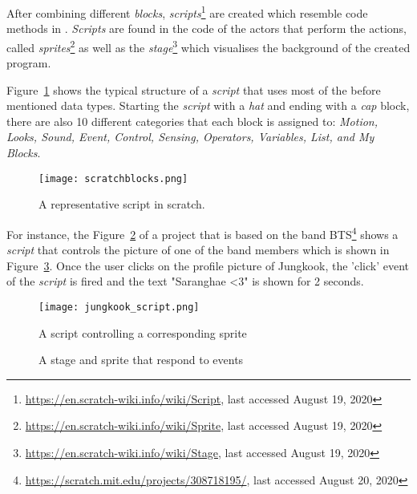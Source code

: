 After combining different \textit{blocks}, \textit{scripts}\footnote{\url{https://en.scratch-wiki.info/wiki/Script}, last accessed August 19, 2020} are created which resemble code methods in \java{}. \textit{Scripts} are found in the code of the actors that perform the actions, called \textit{sprites}\footnote{\url{https://en.scratch-wiki.info/wiki/Sprite}, last accessed August 19, 2020} as well as the \textit{stage}\footnote{\url{https://en.scratch-wiki.info/wiki/Stage}, last accessed August 19, 2020} which visualises the background of the created program. 

Figure~\ref{fig:scratchblocks} shows the typical structure of a \scratch{} \textit{script} that uses most of the before mentioned data types. Starting the \textit{script} with a \textit{hat} and ending with a \textit{cap} block, there are also 10 different categories that each block is assigned to: \textit{Motion, Looks, Sound, Event, Control, Sensing, Operators, Variables, List, and My Blocks}. 

\begin{figure}[t]
    \centering
    \texttt{[image: scratchblocks.png]}
    \caption[A representative \scratch\ script]{\label{fig:scratchblocks} A representative script in scratch.}
\end{figure}

For instance, the Figure~\ref{fig:script} of a \scratch{} project that is based on the band BTS\footnote{\url{https://scratch.mit.edu/projects/308718195/}, last accessed August 20, 2020} shows a \textit{script} that controls the picture of one of the band members which is shown in Figure~\ref{fig:sprite}. Once the user clicks on the profile picture of Jungkook, the 'click' event of the \textit{script} is fired and the text "Saranghae <3" is shown for 2 seconds.

\begin{figure}[t]
    \centering
    \texttt{[image: jungkook\_script.png]}
    \caption[Program that controls a sprite]{\label{fig:script} A \scratch{} script controlling a corresponding sprite}
\end{figure}

\begin{figure}%
    \centering
    \qquad
    \caption[A sprite's reaction after an executed event]{\label{fig:sprite}A \scratch{} stage and sprite that respond to events}%
\end{figure}

